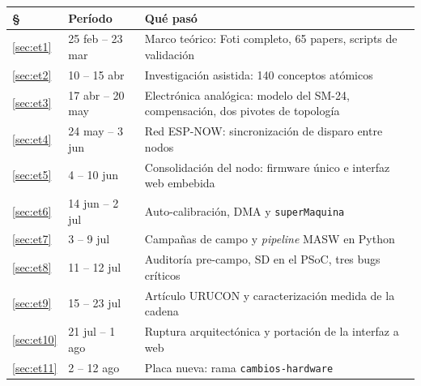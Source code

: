 \begin{center}\small
\begin{tabularx}{\textwidth}{@{}l l X@{}}
\toprule
\textbf{\S} & \textbf{Per\'iodo} & \textbf{Qu\'e pas\'o} \\
\midrule
\ref{sec:et1} & 25 feb -- 23 mar & Marco te\'orico: Foti completo, 65 papers, scripts de validaci\'on \\
\ref{sec:et2} & 10 -- 15 abr & Investigaci\'on asistida: 140 conceptos at\'omicos \\
\ref{sec:et3} & 17 abr -- 20 may & Electr\'onica anal\'ogica: modelo del SM-24, compensaci\'on, dos pivotes de topolog\'ia \\
\ref{sec:et4} & 24 may -- 3 jun & Red ESP-NOW: sincronizaci\'on de disparo entre nodos \\
\ref{sec:et5} & 4 -- 10 jun & Consolidaci\'on del nodo: firmware \'unico e interfaz web embebida \\
\ref{sec:et6} & 14 jun -- 2 jul & Auto-calibraci\'on, DMA y \texttt{superMaquina} \\
\ref{sec:et7} & 3 -- 9 jul & Campa\~nas de campo y \emph{pipeline} MASW en Python \\
\ref{sec:et8} & 11 -- 12 jul & Auditor\'ia pre-campo, SD en el PSoC, tres bugs cr\'iticos \\
\ref{sec:et9} & 15 -- 23 jul & Art\'iculo URUCON y caracterizaci\'on medida de la cadena \\
\ref{sec:et10} & 21 jul -- 1 ago & Ruptura arquitect\'onica y portaci\'on de la interfaz a web \\
\ref{sec:et11} & 2 -- 12 ago & Placa nueva: rama \texttt{cambios-hardware} \\
\bottomrule
\end{tabularx}
\end{center}
